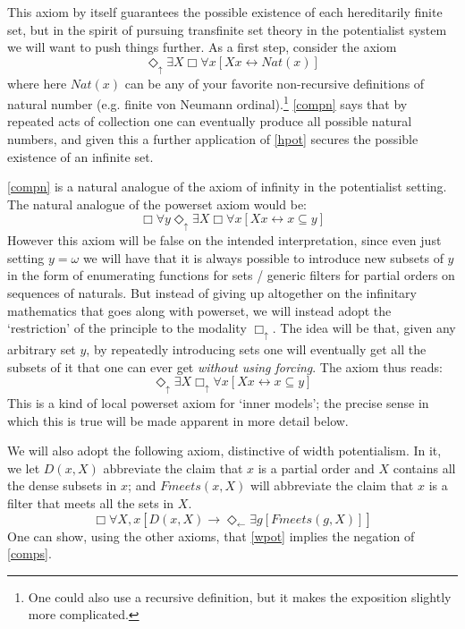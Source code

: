 \documentclass{article}
\theoremstyle{definition}
\newcommand{\du}{\Diamond_\uparrow}
\newcommand{\dl}{\Diamond_\leftarrow}
\newcommand{\bu}{\Box_\uparrow}
\begin{document}
This axiom by itself guarantees the possible existence of each hereditarily finite set, but 
in the spirit of pursuing transfinite set theory in the potentialist system we will want to 
push things further. As a first step, consider the axiom 
\begin{equation}\label{compn}
    \du \exists X \Box \forall x [ Xx \leftrightarrow Nat(x)]
\end{equation}
where here $Nat(x)$ can be any of your favorite non-recursive definitions of natural number 
(e.g. finite von Neumann ordinal).\footnote{One could also 
use a recursive definition, but it makes the exposition slightly more complicated.} 
\eqref{compn} says that by repeated acts of collection one can eventually 
produce all possible natural numbers,
and given this a further application of \eqref{hpot} secures the possible 
existence of an infinite set.

\eqref{compn} is a natural analogue of the axiom of infinity in the potentialist setting. The 
natural analogue of the powerset axiom would be:
\begin{equation}\label{comps}
    \Box \forall y \du \exists X \Box \forall x [ Xx \leftrightarrow x \subseteq y]
\end{equation}
However this 
axiom will be false on the intended interpretation, since even just setting $y = \omega$ we will have 
that it is always possible to introduce new subsets of $y$ in the form of enumerating functions for sets /
generic filters for partial orders on sequences of naturals. But instead of giving up altogether on the infinitary mathematics that goes 
along with powerset, we will instead adopt the `restriction' of the principle to the modality $\bu$.
The idea will be that, given any arbitrary set $y$, by repeatedly introducing sets one will 
eventually get all the subsets of it that one can ever get \emph{without using forcing}. The 
axiom thus reads:
\begin{equation}\label{comps2}
    \du \exists X \bu \forall x [ Xx \leftrightarrow x \subseteq y]
\end{equation}
 This is 
a kind of local powerset axiom for `inner models'; the precise sense in which this is true will 
be made apparent in more detail below.

We will also adopt the following axiom, distinctive of width potentialism. In it, we let 
$D(x, X)$ abbreviate the claim that $x$ is a partial order and $X$ contains all the dense subsets 
in $x$; and $Fmeets(x, X)$ will abbreviate the claim that $x$ is a filter that 
meets all the sets in $X$.
\begin{equation}\label{wpot}
    \Box \forall X, x [D(x, X) \rightarrow \dl \exists g[Fmeets(g, X)]]
\end{equation}
One can show, using the other axioms, that \eqref{wpot} implies the negation of \eqref{comps}.
\end{document}
